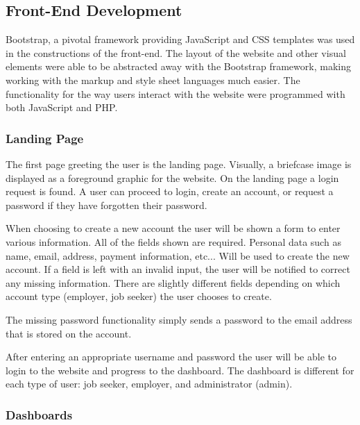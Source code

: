 \documentclass[11pt]{article}
\begin{document}
\subsection{Front-End Development}

Bootstrap, a pivotal framework providing JavaScript and CSS templates was used in the constructions of the front-end. The layout of the website and other visual elements were able to be abstracted away with the Bootstrap framework, making working with the markup and style sheet languages much easier. The functionality for the way users interact with the website were programmed with both JavaScript and PHP.

\subsubsection{Landing Page}

The first page greeting the user is the landing page. Visually, a briefcase image is displayed as a foreground graphic for the website. On the landing page a login request is found. A user can proceed to login, create an account, or request a password if they have forgotten their password. \par
When choosing to create a new account the user will be shown a form to enter various information. All of the fields shown are required. Personal data such as name, email, address, payment information, etc... Will be used to create the new account. If a field is left with an invalid input, the user will be notified to correct any missing information. There are slightly different fields depending on which account type (employer, job seeker) the user chooses to create. \par
The missing password functionality simply sends a password to the email address that is stored on the account. \par
After entering an appropriate username and password the user will be able to login to the website and progress to the dashboard. The dashboard is different for each type of user: job seeker, employer, and administrator (admin).

\subsubsection{Dashboards}
\end{document}

